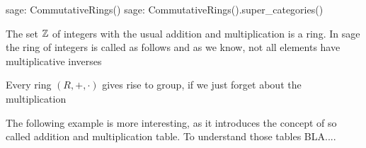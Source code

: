 \begin{sagecommandline}
sage: CommutativeRings()
sage: CommutativeRings().super_categories()
\end{sagecommandline}

\begin{example} The set $\mathbb{Z}$ of integers with the usual addition and multiplication is a ring. In sage the ring of integers is called as follows and as we know, not all elements have multiplicative inverses

\end{example}
\begin{example} Every ring $(R,+,\cdot)$ gives rise to group, if we just forget about the multiplication
\end{example}
The following example is more interesting, as it introduces the concept of so called addition and multiplication table. To understand those tables BLA....

